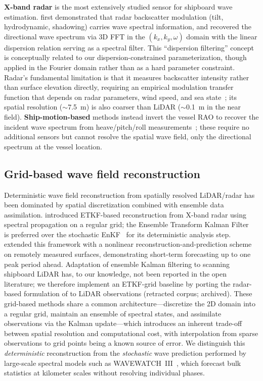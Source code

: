 \documentclass[review]{elsarticle}
\begin{document}
\textbf{X-band radar} is the most extensively studied sensor for
shipboard wave estimation.
\citet{young1985} first demonstrated that radar backscatter
modulation (tilt, hydrodynamic, shadowing) carries wave spectral
information, and \citet{nieto2004} recovered the directional wave
spectrum via 3D FFT in the $(k_x, k_y, \omega)$ domain with the
linear dispersion relation serving as a spectral filter.
This ``dispersion filtering'' concept is conceptually related to
our dispersion-constrained parameterization, though applied in the
Fourier domain rather than as a hard parameter constraint.
Radar's fundamental limitation is that it measures backscatter
intensity rather than surface elevation directly, requiring an
empirical modulation transfer function that depends on radar
parameters, wind speed, and sea state~\citep{nieto2004}; its
spatial resolution ($\sim$7.5~m) is also coarser than LiDAR
($\sim$0.1~m in the near field).
\textbf{Ship-motion-based} methods instead invert the vessel RAO
to recover the incident wave spectrum from heave/pitch/roll
measurements~\citep{naaijen2014, nielsen2006}; these require no
additional sensors but cannot resolve the spatial wave field, only
the directional spectrum at the vessel location.

\subsection{Grid-based wave field reconstruction}

Deterministic wave field reconstruction from spatially resolved
LiDAR/radar has been dominated by spatial discretization combined
with ensemble data assimilation.
\citet{desmars2020} introduced ETKF-based reconstruction from X-band
radar using spectral propagation on a regular grid; the Ensemble
Transform Kalman Filter~\citep{hunt2007} is preferred over the
stochastic EnKF~\citep{evensen2003} for its deterministic analysis
step.
\citet{desmars2023jfm} extended this framework with a nonlinear
reconstruction-and-prediction scheme on remotely measured surfaces,
demonstrating short-term forecasting up to one peak period ahead.
Adaptation of ensemble Kalman filtering to scanning shipboard LiDAR
has, to our knowledge, not been reported in the open literature; we
therefore implement an ETKF-grid baseline by porting the radar-based
formulation of \citet{desmars2020} to LiDAR observations
(retracted corpus; archived).
These grid-based methods share a common architecture---discretize
the 2D domain into a regular grid, maintain an ensemble of spectral
states, and assimilate observations via the Kalman update---which
introduces an inherent trade-off between spatial resolution and
computational cost, with interpolation from sparse observations to
grid points being a known source of error.
We distinguish this \emph{deterministic} reconstruction from the
\emph{stochastic} wave prediction performed by large-scale spectral
models such as WAVEWATCH~III~\citep{tolman2009}, which forecast
bulk statistics at kilometer scales without resolving individual
phases.
\end{document}
